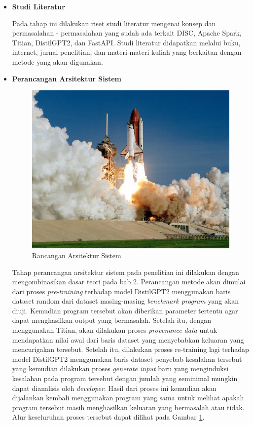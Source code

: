\begin{itemize}[topsep=0pt]
  \item \textbf{Studi Literatur}
  
  Pada tahap ini dilakukan riset studi literatur mengenai konsep 
  dan permasalahan - permasalahan yang sudah ada terkait DISC, 
  Apache Spark, Titian, DistilGPT2, dan FastAPI. Studi literatur didapatkan melalui buku, internet, jurnal penelitian, dan materi-materi kuliah yang berkaitan dengan metode yang akan digunakan.

  \item \textbf{Perancangan Arsitektur Sistem}
  
  \begin{figure}[H]
    \centering
    \includegraphics[scale=0.35]{gambar/roketluarangkasa.jpg}
  
    \caption{Rancangan Arsitektur Sistem}
    \label{fig:arsitektur}
  \end{figure}
  
  Tahap perancangan arsitektur sistem pada penelitian ini 
  dilakukan dengan mengombinasikan dasar teori pada bab 2. 
  Perancangan metode akan dimulai dari proses \emph{pre-training}
  terhadap model DistilGPT2 menggunakan baris dataset random dari 
  dataset masing-masing \emph{benchmark program} yang akan 
  diuji. Kemudian program tersebut akan diberikan parameter tertentu 
  agar dapat menghasilkan output yang bermasalah. Setelah itu,
  dengan menggunakan Titian, akan dilakukan proses \emph{provenance data}
  untuk mendapatkan nilai awal dari baris dataset yang menyebabkan
  keluaran yang mencurigakan tersebut. 
  Setelah itu, dilakukan proses re-training lagi terhadap
  model DistilGPT2 menggunakan baris dataset penyebab kesalahan
  tersebut yang kemudian dilakukan proses \emph{generate input}
  baru yang menginduksi kesalahan pada program tersebut dengan jumlah
  yang seminimal mungkin dapat dianalisis oleh \emph{developer}. 
  Hasil dari proses ini kemudian akan dijalankan kembali menggunakan
  program yang sama untuk melihat apakah program tersebut masih
  menghasilkan keluaran yang bermasalah atau tidak.
  Alur keseluruhan proses tersebut dapat dilihat pada 
  Gambar \ref{fig:arsitektur}.


\end{itemize}
